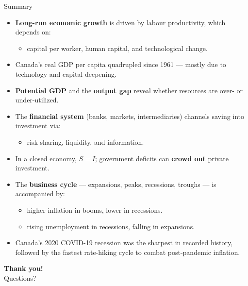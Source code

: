 \documentclass[aspectratio=169]{beamer}
\begin{document}
\begin{frame}{Summary}
\transfade
\begin{itemize}
  \item \textbf{Long-run economic growth} is driven by \alert{labour productivity}, which depends on:
  \begin{itemize}
    \item capital per worker, human capital, and technological change.
  \end{itemize}
  \item Canada's real GDP per capita quadrupled since 1961 --- mostly due to technology and capital deepening.
  \item \textbf{Potential GDP} and the \textbf{output gap} reveal whether resources are over- or under-utilized.
  \item The \textbf{financial system} (banks, markets, intermediaries) channels saving into investment via:
  \begin{itemize}
    \item risk-sharing, liquidity, and information.
  \end{itemize}
  \item In a closed economy, $S = I$; government deficits can \textbf{crowd out} private investment.
  \item The \textbf{business cycle} --- expansions, peaks, recessions, troughs --- is accompanied by:
  \begin{itemize}
    \item higher inflation in booms, lower in recessions.
    \item rising unemployment in recessions, falling in expansions.
  \end{itemize}
  \item Canada's 2020 COVID-19 recession was the sharpest in recorded history, followed by the fastest rate-hiking cycle to combat post-pandemic inflation.
\end{itemize}
\end{frame}

\begin{frame}
\centering
\Huge \textbf{Thank you!}\\[1em]
\large Questions?
\end{frame}
\end{document}
